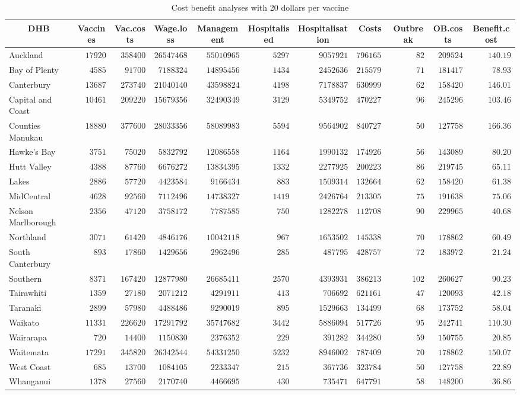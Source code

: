 \documentclass{article}
\begin{document}
\begin{table}\small
\caption{Cost benefit analyses with 20 dollars per vaccine}
\begin{center}
\begin{tabular}{lrrrrrrrrrr}
\hline\hline
\multicolumn{1}{c}{DHB}&\multicolumn{1}{c}{Vaccines}&\multicolumn{1}{c}{Vac.costs}&\multicolumn{1}{c}{Wage.loss}&\multicolumn{1}{c}{Management}&\multicolumn{1}{c}{Hospitalised}&\multicolumn{1}{c}{Hospitalisation}&\multicolumn{1}{c}{Costs}&\multicolumn{1}{c}{Outbreak}&\multicolumn{1}{c}{OB.costs}&\multicolumn{1}{c}{Benefit.cost}\tabularnewline
\hline
Auckland&$17920$&$358400$&$26547468$&$55010965$&$5297$&$9057921$&$79616516$&$ 82$&$209524$&$140.19$\tabularnewline
Bay of Plenty&$ 4585$&$ 91700$&$ 7188324$&$14895456$&$1434$&$2452636$&$21557962$&$ 71$&$181417$&$ 78.93$\tabularnewline
Canterbury&$13687$&$273740$&$21040140$&$43598824$&$4198$&$7178837$&$63099902$&$ 62$&$158420$&$146.01$\tabularnewline
Capital and Coast&$10461$&$209220$&$15679356$&$32490349$&$3129$&$5349752$&$47022778$&$ 96$&$245296$&$103.46$\tabularnewline
Counties Manukau&$18880$&$377600$&$28033356$&$58089983$&$5594$&$9564902$&$84072731$&$ 50$&$127758$&$166.36$\tabularnewline
Hawke's Bay&$ 3751$&$ 75020$&$ 5832792$&$12086558$&$1164$&$1990132$&$17492688$&$ 56$&$143089$&$ 80.20$\tabularnewline
Hutt Valley&$ 4388$&$ 87760$&$ 6676272$&$13834395$&$1332$&$2277925$&$20022305$&$ 86$&$219745$&$ 65.11$\tabularnewline
Lakes&$ 2886$&$ 57720$&$ 4423584$&$ 9166434$&$ 883$&$1509314$&$13266438$&$ 62$&$158420$&$ 61.38$\tabularnewline
MidCentral&$ 4628$&$ 92560$&$ 7112496$&$14738327$&$1419$&$2426764$&$21330552$&$ 75$&$191638$&$ 75.06$\tabularnewline
Nelson Marlborough&$ 2356$&$ 47120$&$ 3758172$&$ 7787585$&$ 750$&$1282278$&$11270851$&$ 90$&$229965$&$ 40.68$\tabularnewline
Northland&$ 3071$&$ 61420$&$ 4846176$&$10042118$&$ 967$&$1653502$&$14533802$&$ 70$&$178862$&$ 60.49$\tabularnewline
South Canterbury&$  893$&$ 17860$&$ 1429656$&$ 2962496$&$ 285$&$ 487795$&$ 4287574$&$ 72$&$183972$&$ 21.24$\tabularnewline
Southern&$ 8371$&$167420$&$12877980$&$26685411$&$2570$&$4393931$&$38621382$&$102$&$260627$&$ 90.23$\tabularnewline
Tairawhiti&$ 1359$&$ 27180$&$ 2071212$&$ 4291911$&$ 413$&$ 706692$&$ 6211616$&$ 47$&$120093$&$ 42.18$\tabularnewline
Taranaki&$ 2899$&$ 57980$&$ 4488486$&$ 9290019$&$ 895$&$1529663$&$13449923$&$ 68$&$173752$&$ 58.04$\tabularnewline
Waikato&$11331$&$226620$&$17291792$&$35747682$&$3442$&$5886094$&$51772645$&$ 95$&$242741$&$110.30$\tabularnewline
Wairarapa&$  720$&$ 14400$&$ 1150830$&$ 2376352$&$ 229$&$ 391282$&$ 3442806$&$ 59$&$150755$&$ 20.85$\tabularnewline
Waitemata&$17291$&$345820$&$26342544$&$54331250$&$5232$&$8946002$&$78740929$&$ 70$&$178862$&$150.07$\tabularnewline
West Coast&$  685$&$ 13700$&$ 1084105$&$ 2233347$&$ 215$&$ 367736$&$ 3237846$&$ 50$&$127758$&$ 22.89$\tabularnewline
Whanganui&$ 1378$&$ 27560$&$ 2170740$&$ 4466695$&$ 430$&$ 735471$&$ 6477915$&$ 58$&$148200$&$ 36.86$\tabularnewline
\hline
\end{tabular}\end{center}\label{table:cost20}
\end{table}
\end{document}
